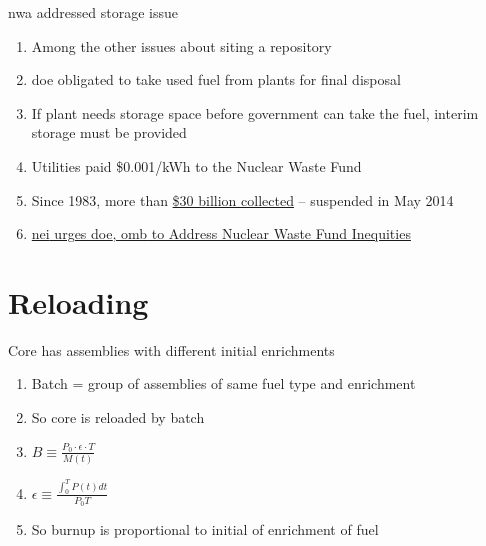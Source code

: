 \documentclass[aspectratio=1610,pdftex,dvipsnames,compress,xcolor={dvipsnames}]{beamer}
\newcommand{\acs}{\acrshort} %
\begin{document}
\begin{frame}{\acs{nwa} addressed storage issue}
    \begin{enumerate}[series=outerlist,topsep=0pt,itemsep=15pt,leftmargin=*,label=(\arabic*)]
        \item[]Among the other issues about siting a repository
        \item[]\acs{doe} obligated to take used fuel from plants for final disposal
        \item[]If plant needs storage space before government can take the fuel, interim storage must be provided
        \item[]Utilities paid \$0.001/kWh to the Nuclear Waste Fund
        \item[]Since 1983, more than \href{https://www.nei.org/resources/statistics/nuclear-waste-fund-payment-information-by-state}{\$30 billion collected} -- suspended in May 2014
        \item[]\href{https://electricenergyonline.com/article/energy/category/generation/52/636743/nei-urges-doe-omb-to-address-nuclear-waste-fund-inequities.html}{\acs{nei} urges \acs{doe}, \acs{omb} to Address Nuclear Waste Fund Inequities}
    \end{enumerate}
\end{frame}


\section{Reloading}


\addtocounter{framenumber}{-1} 
\begin{frame}{Core has assemblies with different initial enrichments}
    \begin{enumerate}[series=outerlist,topsep=0pt,itemsep=21pt,leftmargin=*,label=(\arabic*)]
        \item[]Batch = group of assemblies of same fuel type and enrichment
        \item[]So core is reloaded by batch
        \item[]$B \equiv \frac{P_0 \cdot \epsilon \cdot T}{M(t)}$
        \item[]$\epsilon \equiv \frac{\int_0^T P(t) dt}{P_0 T}$
        \item[]So burnup is proportional to initial of enrichment of fuel
    \end{enumerate}
\end{frame}
\end{document}
